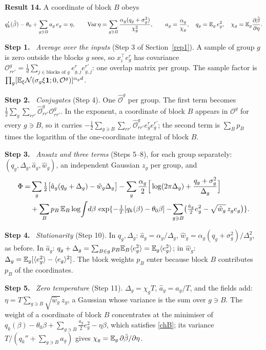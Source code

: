 \documentclass[10pt]{article}
\newcommand{\step}[1]{\par\smallskip\textbf{Step #1.}\ }
\begin{document}
\textbf{Result 14.} A coordinate of block $B$ obeys
\begin{equation}\label{chB}
q_k'(\hat\beta)-\theta_0+\sum_{g\ni B}a_g\,e_g=\eta,\qquad\operatorname{Var}\eta=\sum_{g\ni B}\frac{\alpha_g(q_g+\sigma_g^2)}{\chi_g^2},\qquad
a_g=\frac{\alpha_g}{\chi_g},\quad q_g=\mathbb E_g\,e_g^2,\quad\chi_g=\mathbb E_g\frac{\partial\hat\beta}{\partial\eta}.
\end{equation}
\step1 \emph{Average over the inputs} (Step 3 of Section~\ref{rep1}). A sample of group $g$ is zero outside the blocks $g$ sees, so $x_i^\top e_g^r$ has covariance $\mathcal O^g_{rr'}=\frac1d\sum_{j\in\text{blocks of }g}e^r_{g,j}e^{r'}_{g,j}$: one overlap matrix per group. The sample factor is $\prod_g[\mathbb E_\xi\mathcal N(\sigma_g\xi\mathbf 1;0,\mathcal O^g)]^{\alpha_gd}$.
\step2 \emph{Conjugates} (Step 4). One $\hat{\mathcal O}^g$ per group. The first term becomes $\frac12\sum_g\sum_{rr'}\hat{\mathcal O}^g_{rr'}\mathcal O^g_{rr'}$. In the exponent, a coordinate of block $B$ appears in $\mathcal O^g$ for every $g\ni B$, so it carries $-\frac12\sum_{g\ni B}\sum_{rr'}\hat{\mathcal O}^g_{rr'}e_g^re_g^{r'}$; the second term is $\sum_Bp_B$ times the logarithm of the one-coordinate integral of block $B$.
\step3 \emph{Ansatz and three terms} (Steps 5--8), for each group separately: $(q_g,\Delta_g,\hat a_g,\hat w_g)$, an independent Gaussian $z_g$ per group, and
\[
\begin{aligned}\Phi=&\sum_g\tfrac12\big[\hat a_g(q_g+\Delta_g)-\hat w_g\Delta_g\big]-\sum_g\frac{\alpha_g}2\Big[\log(2\pi\Delta_g)+\frac{q_g+\sigma_g^2}{\Delta_g}\Big]\\&+\sum_Bp_B\,\mathbb E_B\log\!\int\!d\beta\,\exp\{-\tfrac1T[q_k(\beta)-\theta_0\beta]-\!\sum_{g\ni B}\!\big(\tfrac{\hat a_g}2e_g^2-\sqrt{\hat w_g}\,z_ge_g\big)\}.\end{aligned}
\]
\step4 \emph{Stationarity} (Step 10). In $q_g,\Delta_g$: $\hat a_g=\alpha_g/\Delta_g$, $\hat w_g=\alpha_g(q_g+\sigma_g^2)/\Delta_g^2$, as before. In $\hat a_g$: $q_g+\Delta_g=\sum_{B\in g}p_B\mathbb E_B\langle e_g^2\rangle=\mathbb E_g\langle e_g^2\rangle$; in $\hat w_g$: $\Delta_g=\mathbb E_g[\langle e_g^2\rangle-\langle e_g\rangle^2]$. The block weights $p_B$ enter because block $B$ contributes $p_B$ of the coordinates.
\step5 \emph{Zero temperature} (Step 11). $\Delta_g=\chi_gT$, $\hat a_g=a_g/T$, and the fields add: $\eta=T\sum_{g\ni B}\sqrt{\hat w_g}\,z_g$, a Gaussian whose variance is the sum over $g\ni B$. The weight of a coordinate of block $B$ concentrates at the minimiser of $q_k(\beta)-\theta_0\beta+\sum_{g\ni B}\frac{a_g}2e_g^2-\eta\beta$, which satisfies \eqref{chB}; its variance $T/(q_k''+\sum_{g\ni B}a_g)$ gives $\chi_g=\mathbb E_g\,\partial\hat\beta/\partial\eta$.
\end{document}
